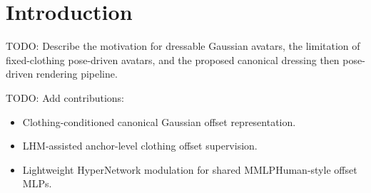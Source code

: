 \section{Introduction}

TODO: Describe the motivation for dressable Gaussian avatars, the limitation of fixed-clothing pose-driven avatars, and the proposed canonical dressing then pose-driven rendering pipeline.

TODO: Add contributions:
\begin{itemize}
  \item Clothing-conditioned canonical Gaussian offset representation.
  \item LHM-assisted anchor-level clothing offset supervision.
  \item Lightweight HyperNetwork modulation for shared MMLPHuman-style offset MLPs.
\end{itemize}

